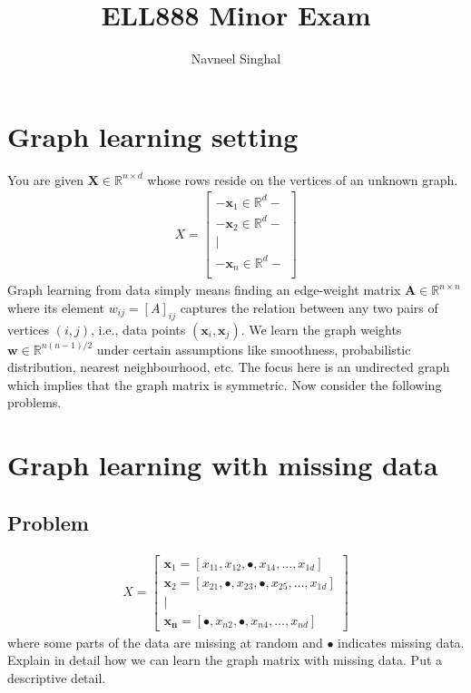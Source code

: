 \documentclass[a4paper]{article}
\title{\textbf{ELL888 Minor Exam}}
\author{Navneel Singhal}
\date{}
\newcommand{\mf}{\mathbf}
\newcommand{\R}{\mathbb{R}}
\begin{document}
\maketitle
\tableofcontents

\section{Graph learning setting}

You are given $\mf{X} \in \R^{n \times d}$ whose rows reside on the vertices of an unknown graph.
\begin{align*}
    X = \begin{bmatrix}
        - \mf{x}_1 \in \R^d -\\
        - \mf{x}_2 \in \R^d -\\
            \mid \\
        - \mf{x}_n \in \R^d -\\
    \end{bmatrix}
\end{align*}
Graph learning from data simply means finding an edge-weight matrix $\mf{A} \in \R^{n \times n}$ where its element $w_{ij} = {[A]}_{ij}$ captures the relation between any two pairs of vertices $(i,
j)$, i.e., data points $(\mf{x}_i, \mf{x}_j)$. We learn the graph weights $\mf{w} \in \R^{n(n - 1)/2}$ under certain assumptions like smoothness, probabilistic distribution, nearest
neighbourhood, etc. The focus here is an undirected graph which implies that the graph matrix is symmetric. Now consider the following problems.

\section{Graph learning with missing data}

\subsection{Problem}
\begin{align*}
    X = \begin{bmatrix}
        \mf{x}_1 = [x_{11}, x_{12}, \bullet, x_{14}, \ldots, x_{1d}]\\
        \mf{x}_2 = [x_{21}, \bullet, x_{23}, \bullet, x_{25}, \ldots, x_{1d}]\\
        \mid\\
        \mf{x_n} = [\bullet, x_{n2}, \bullet, x_{n4}, \ldots, x_{nd}]
    \end{bmatrix}
\end{align*}
where some parts of the data are missing at random and $\bullet$ indicates missing data. Explain in detail how we can learn the graph matrix with missing data. Put a descriptive detail.
\end{document}
